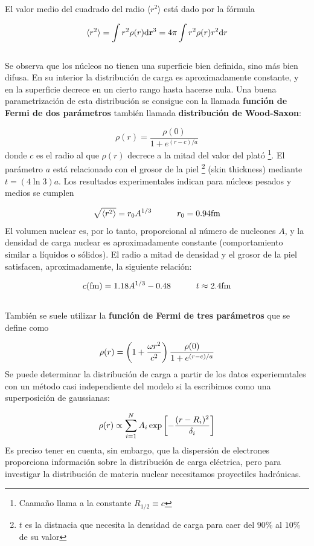 
El valor medio del cuadrado del radio $\langle r^2 \rangle$ está dado por la fórmula

\begin{equation}
	\langle r^2 \rangle = \int r^2 \rho (r) \mathrm{d} \mathbf{r}^3 = 4\pi \int r^2 \rho (r) r^2 \mathrm{d} r
\end{equation} \\


Se observa que los núcleos no tienen una superficie bien definida, sino más bien difusa. En su interior la distribución de carga es aproximadamente constante, y en la superficie decrece en un cierto rango hasta hacerse nula. Una buena parametrización de esta distribución se consigue con la llamada \textbf{función de Fermi de dos parámetros} también llamada \textbf{distribución de Wood-Saxon}:

\begin{equation}
    \rho (r) = \frac{\rho(0)}{1+e^{(r-c)/a}}
\end{equation}
donde $c$ es el radio al que $\rho(r)$ decrece a la mitad del valor del plató \footnote{Caamaño llama a la constante $R_{1/2}\equiv c$}. El parámetro $a$ está relacionado con el grosor de la piel \footnote{$t$ es la distnacia que necesita la densidad de carga para caer del $90\%$ al $10\%$ de su valor} (skin thickness) mediante $t=(4\ln 3)a$. Los resultados experimentales indican para núcleos pesados y medios se cumplen 

\begin{equation}
	\sqrt{\langle r^2 \rangle} = r_0 A^{1/3} \tquad r_0 = 0.94 \unit{\fm}
\end{equation}
El volumen nuclear es, por lo tanto, proporcional al número de nucleones $A$, y la densidad de carga nuclear es aproximadamente constante (comportamiento similar a líquidos o sólidos). El radio a mitad de densidad y el grosor de la piel satisfacen, aproximadamente, la siguiente relación:

\begin{equation}
    c(\unit{\fm}) = 1.18A^{1/3} - 0.48 \tquad t \approx 2.4 \unit{\fm}
\end{equation} \\

También se suele utilizar la \textbf{función de Fermi de tres parámetros} que se define como

\begin{equation}
    \rho (r) = \left( 1+ \frac{\omega r^2}{c^2} \right) \frac{\rho (0)}{1+e^{(r-c)/a}} 
\end{equation}
Se puede determinar la distribución de carga a partir de los datos experiemntales con un método casi independiente del modelo si la escribimos como una superposición de gaussianas:

\begin{equation}
	\rho (r) \propto \sum_{i=1}^N A_i \exp \left[ - \frac{(r-R_i)^2}{\delta_i} \right]
\end{equation}
Es preciso tener en cuenta, sin embargo, que la dispersión de electrones proporciona información sobre la distribución de carga eléctrica, pero para investigar la distribución de materia nuclear necesitamos proyectiles hadrónicas.

